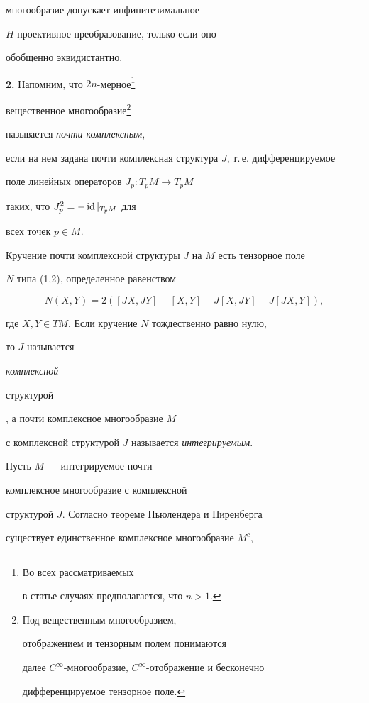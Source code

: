 многообразие допускает инфинитезимальное


$H$-проективное преобразование, только если оно


обобщенно эквидистантно.


\medskip





{\bf 2.} Напомним, что $2n$-мерное\footnote{Во всех рассматриваемых


в статье случаях предполагается, что $n > 1$.}


вещественное многообразие\footnote{Под вещественным многообразием,


отображением и тензорным полем понимаются


далее $C^{\infty}$-многообразие, $C^{\infty}$-отображение и бесконечно


дифференцируемое тензорное поле.}


называется {\it почти комплексным},


если на нем задана почти комплексная структура $J$, т.\,е. дифференцируемое


поле линейных операторов $J_p:T_pM \to T_pM$


таких, что $J_p^2=-\operatorname{id}|_{T_p M}$ для


всех точек $p \in M$.





Кручение почти комплексной структуры $J$ на $M$ есть тензорное поле


$N$ типа (1,2), определенное равенством


$$


N(X,Y) = 2 ([JX,JY]- [X,Y] - J[X,JY] - J[JX,Y]),


$$


где $X,Y \in TM$. Если кручение $N$ тождественно равно нулю,


то $J$ называется {\it комплексной


структурой}, а почти комплексное многообразие $M$


с комплексной структурой $J$ называется {\it интегрируемым}.





Пусть $M$ --- интегрируемое почти


комплексное многообразие с комплексной


структурой $J$. Согласно теореме Ньюлендера и Ниренберга \cite{neni}


существует единственное комплексное многообразие $M^c$,


